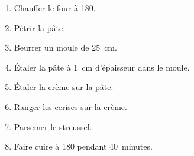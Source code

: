 \begin{recipe}
  \begin{enumerate}

  \item Chauffer le four à 180\degreeC.

  \item Pétrir la pâte.

  \item Beurrer un moule de 25~cm.

  \item Étaler la pâte à 1~cm d'épaisseur dans le moule.

  \item Étaler la crème sur la pâte.

  \item Ranger les cerises sur la crème.

  \item Parsemer le streussel.

  \item Faire cuire à 180\degreeC{} pendant{} 40~minutes.

  \end{enumerate}
\end{recipe}

